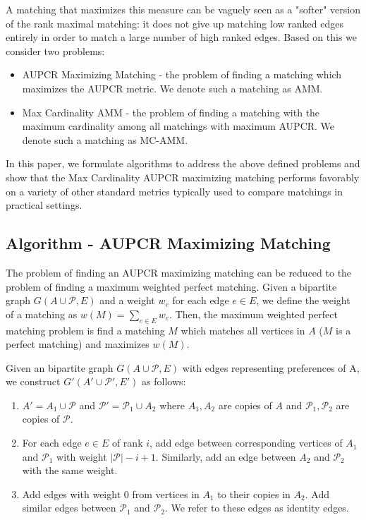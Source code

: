 \documentclass[letterpaper]{article} %
\begin{document}
A matching that maximizes this measure can be vaguely seen as a "softer" version of the rank maximal matching: it does not give up matching low ranked edges entirely in order to match a large number of high ranked edges. Based on this we consider two problems:
\begin{itemize}
\item AUPCR Maximizing Matching - the problem of finding a matching which maximizes the AUPCR metric. We denote such a matching as AMM.
\item Max Cardinality AMM - the problem of finding a matching with the maximum cardinality among all matchings with maximum AUPCR. We denote such a matching as MC-AMM.
\end{itemize}

In this paper, we formulate algorithms to address the above defined problems and show that the Max Cardinality AUPCR maximizing matching performs favorably on a variety of other standard metrics typically used to compare matchings in practical settings.

\subsection{Algorithm - AUPCR Maximizing Matching}
The problem of finding an AUPCR maximizing matching can be reduced to the problem of finding a maximum weighted perfect matching. Given a bipartite graph $G(A\cup \mathcal{P}, E)$ and a weight $w_e$ for each edge $e \in E$, we define the weight of a matching as $w(M) = \sum_{e \in E} w_e$. Then, the maximum weighted perfect matching problem is find a matching $M$ which matches all vertices in $A$ ($M$ is a perfect matching) and maximizes $w(M)$.

Given an bipartite graph $G(A\cup \mathcal{P}, E)$ with edges representing preferences of A, we construct $G'(A' \cup \mathcal{P}', E')$ as follows: \begin{enumerate}
\item $A' = A_1 \cup \mathcal{P}$ and $\mathcal{P}' = \mathcal{P}_1 \cup A_2$ where $A_1, A_2$ are copies of $A$ and $\mathcal{P}_1, \mathcal{P}_2$ are copies of $\mathcal{P}$.
\item For each edge $e \in E$ of rank $i$, add edge between corresponding vertices of $A_1$ and $\mathcal{P}_1$ with weight $|\mathcal{P}| - i+1$. Similarly, add an edge between $A_2$ and $\mathcal{P}_2$ with the same weight.
\item Add edges with weight 0 from vertices in $A_1$ to their copies in $A_2$. Add similar edges between $\mathcal{P}_1$ and $\mathcal{P}_2$. We refer to these edges as identity edges.
\end{enumerate}
\end{document}
